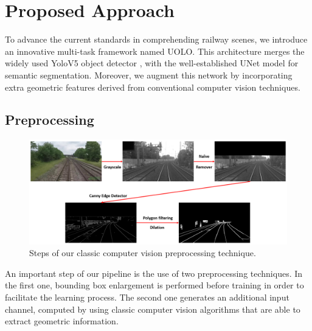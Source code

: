 \documentclass[conference]{IEEEtran}
\begin{document}

\section{Proposed Approach}
\label{sec:methodology}

To advance the current standards in comprehending railway scenes, we introduce an innovative multi-task framework named UOLO. This architecture merges the widely used YoloV5 object detector \cite{glenn_jocher_2020_4154370}, \cite{bochkovskiy2020yolov4} with the well-established UNet model \cite{ronneberger2015u} for semantic segmentation. Moreover, we augment this network by incorporating extra geometric features derived from conventional computer vision techniques.

\subsection{Preprocessing}

\begin{figure}[htb]
    \centering
	\centerline{\includegraphics[scale=0.7]{figures/geometric_prior.png}}
	\caption{Steps of our classic computer vision preprocessing technique.}
	\label{fig:geometricprior}
\end{figure}

An important step of our pipeline is the use of two preprocessing techniques. In the first one, bounding box enlargement is performed before training in order to facilitate the learning process. The second one generates an additional input channel, computed by using classic computer vision algorithms that are able to extract geometric information.
\end{document}
